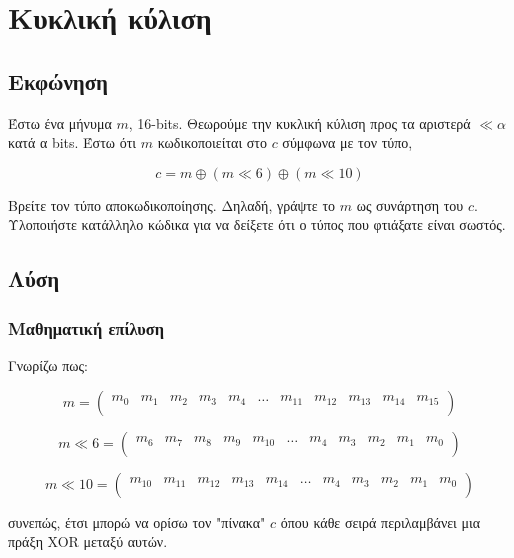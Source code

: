 \documentclass[oneside]{article}
\begin{document}
\section{Κυκλική κύλιση}

\subsection{Εκφώνηση} 

Έστω ένα μήνυμα $m$, 16-bits. Θεωρούμε την κυκλική κύλιση προς τα αριστερά $ \ll \alpha$ κατά α bits. Έστω ότι $m$ κωδικοποιείται στο $c$ σύμφωνα με τον τύπο,

\begin{equation}
    c = m \oplus (m\ll6) \oplus (m\ll10)
\end{equation}

Βρείτε τον τύπο αποκωδικοποίησης. Δηλαδή, γράψτε το $m$ ως συνάρτηση του $c$. Υλοποιήστε κατάλληλο κώδικα για να δείξετε ότι ο τύπος που φτιάξατε είναι σωστός.

\subsection{Λύση} 

\subsubsection{Μαθηματική επίλυση}

Γνωρίζω πως:

\[
    m = 
    \begin{pmatrix}
        m_0 & m_1 & m_2 & m_3 & m_4 & \dots & m_{11} & m_{12} & m_{13} & m_{14} & m_{15} \\
    \end{pmatrix}
\]
    
\[
    m \ll 6= 
    \begin{pmatrix}
        m_6 & m_7 & m_8 & m_9 & m_{10} & \dots & m_4 & m_3 & m_2 & m_1 & m_0 \\
    \end{pmatrix}
\]
    
\[
    m \ll 10= 
    \begin{pmatrix}
        m_{10} & m_{11} & m_{12} & m_{13} & m_{14} & \dots & m_4 & m_3 & m_2 & m_1 & m_0 \\
    \end{pmatrix}
\]

συνεπώς, έτσι μπορώ να ορίσω τον "πίνακα" $c$ όπου κάθε σειρά περιλαμβάνει μια πράξη XOR μεταξύ αυτών. 
\end{document}
